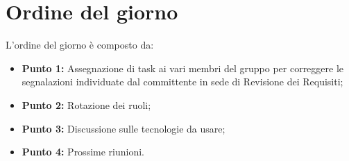 \section{Ordine del giorno}
L'ordine del giorno è composto da: 
\begin{itemize}
	\item \textbf{Punto 1:} Assegnazione di task ai vari membri del gruppo per correggere le segnalazioni individuate dal committente in sede di Revisione dei Requisiti;
	\item \textbf{Punto 2:} Rotazione dei ruoli;
	\item \textbf{Punto 3:} Discussione sulle tecnologie da usare;
	\item \textbf{Punto 4:} Prossime riunioni.
\end{itemize}
